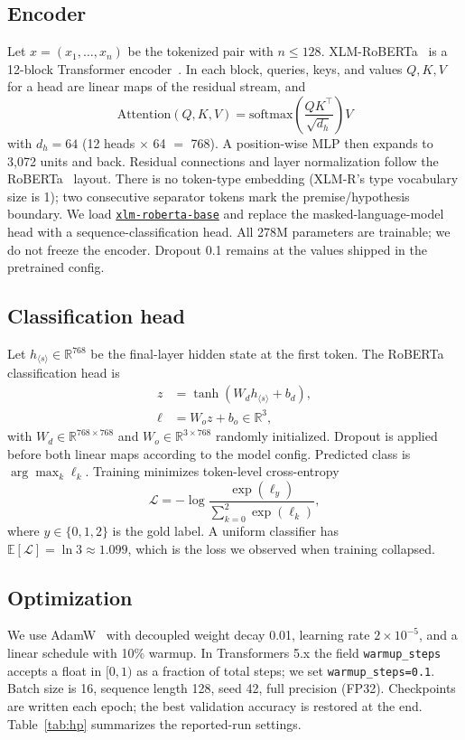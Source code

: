 \documentclass[conference]{IEEEtran}
\newcommand{\xlmr}{\href{https://huggingface.co/FacebookAI/xlm-roberta-base}{\texttt{xlm-roberta-base}}}
\begin{document}
\subsection{Encoder}
Let $x=(x_1,\ldots,x_n)$ be the tokenized pair with $n\le 128$. XLM-RoBERTa~\citep{conneau2020xlmr} is a 12-block Transformer encoder~\citep{vaswani2017attention}. In each block, queries, keys, and values $Q,K,V$ for a head are linear maps of the residual stream, and
\begin{equation}
  \mathrm{Attention}(Q,K,V)
  = \mathrm{softmax}\!\left(\frac{QK^{\top}}{\sqrt{d_h}}\right)V
\end{equation}
with $d_h=64$ (12 heads $\times$ 64 $=$ 768). A position-wise MLP then expands to 3{,}072 units and back. Residual connections and layer normalization follow the RoBERTa~\citep{liu2019roberta} layout. There is no token-type embedding (XLM-R's type vocabulary size is 1); two consecutive separator tokens mark the premise/hypothesis boundary. We load \xlmr{} and replace the masked-language-model head with a sequence-classification head. All 278M parameters are trainable; we do not freeze the encoder. Dropout 0.1 remains at the values shipped in the pretrained config.

\subsection{Classification head}
Let $h_{\langle s\rangle} \in \mathbb{R}^{768}$ be the final-layer hidden state at the first token. The RoBERTa classification head is
\begin{align}
  z &= \tanh(W_d h_{\langle s\rangle} + b_d), \\
  \ell &= W_o z + b_o \in \mathbb{R}^{3},
\end{align}
with $W_d \in \mathbb{R}^{768\times 768}$ and $W_o \in \mathbb{R}^{3\times 768}$ randomly initialized. Dropout is applied before both linear maps according to the model config. Predicted class is $\arg\max_k \ell_k$. Training minimizes token-level cross-entropy
\begin{equation}
  \mathcal{L}
  = -\log \frac{\exp(\ell_y)}{\sum_{k=0}^{2}\exp(\ell_k)},
\end{equation}
where $y\in\{0,1,2\}$ is the gold label. A uniform classifier has $\mathbb{E}[\mathcal{L}]=\ln 3 \approx 1.099$, which is the loss we observed when training collapsed.

\subsection{Optimization}
We use AdamW~\citep{loshchilov2019decoupled,kingma2015adam} with decoupled weight decay 0.01, learning rate $2\times 10^{-5}$, and a linear schedule with 10\% warmup. In Transformers 5.x the field \texttt{warmup\_steps} accepts a float in $[0,1)$ as a fraction of total steps; we set \texttt{warmup\_steps=0.1}. Batch size is 16, sequence length 128, seed 42, full precision (FP32). Checkpoints are written each epoch; the best validation accuracy is restored at the end. Table~\ref{tab:hp} summarizes the reported-run settings.
\end{document}

